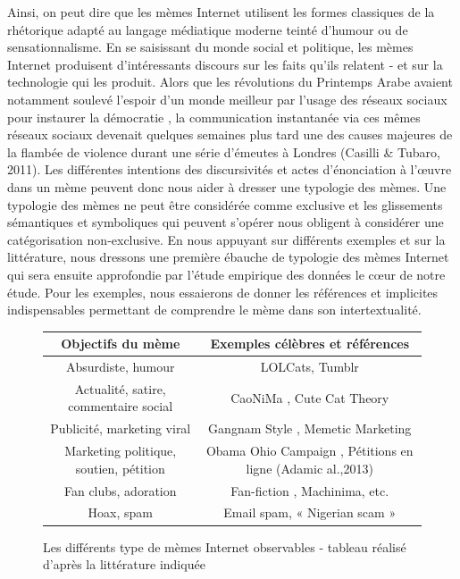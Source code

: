 Ainsi, on peut dire que les m\`emes Internet utilisent les formes
classiques de la rh\'etorique adapt\'e au langage m\'ediatique moderne
teint\'e d{\textquoteright}humour ou de sensationnalisme. En se
saisissant du monde social et politique, les m\`emes Internet
produisent d{\textquoteright}int\'eressants discours sur les faits
qu{\textquoteright}ils relatent - et sur la technologie qui les
produit. Alors que les r\'evolutions du Printemps Arabe avaient
notamment soulev\'e l{\textquoteright}espoir d{\textquoteright}un monde
meilleur par l{\textquoteright}usage des r\'eseaux sociaux pour
instaurer la d\'emocratie \cite{Lotan et al.2011}, la communication
instantan\'ee via ces m\^emes r\'eseaux sociaux devenait quelques
semaines plus tard une des causes majeures de la flamb\'ee de violence
durant une s\'erie d{\textquoteright}\'emeutes \`a Londres (Casilli \&
Tubaro, 2011). Les diff\'erentes intentions des discursivit\'es et
actes d{\textquoteright}\'enonciation \`a l{\textquoteright}{\oe}uvre
dans un m\`eme peuvent donc nous aider \`a dresser une typologie des
m\`emes. Une typologie des m\`emes ne peut \^etre consid\'er\'ee comme
exclusive et les glissements s\'emantiques et symboliques qui peuvent
s{\textquoteright}op\'erer nous obligent \`a consid\'erer une
cat\'egorisation non-exclusive. En nous appuyant sur diff\'erents
exemples et sur la litt\'erature, nous dressons une premi\`ere
\'ebauche de typologie des m\`emes Internet qui sera ensuite
approfondie par l{\textquoteright}\'etude empirique des donn\'ees le
c{\oe}ur de notre \'etude. Pour les exemples, nous essaierons de donner
les r\'ef\'erences et implicites indispensables permettant de
comprendre le m\`eme dans son intertextualit\'e.

\begin{figure}
    \centering
    \begin{tabular}{c|c}
    Objectifs du mème  & Exemples célèbres et références \\
    \hline
    Absurdiste, humour &  LOLCats, Tumblr \cite{Bauckhage2011} \\
    \hline
    Actualité, satire, commentaire social  & CaoNiMa \cite{Mina2012}, Cute Cat Theory \cite{Zuckerman2010} \\
    \hline
    Publicité, marketing viral & Gangnam Style \cite{Bolsover2013}, Memetic Marketing \cite{Flor2000} \\
    \hline
    Marketing politique, soutien, pétition & Obama Ohio Campaign \cite{Walker2012}, Pétitions en ligne (Adamic al.,2013) \\
    \hline
    Fan clubs, adoration  &  Fan-fiction , Machinima, etc. \\
    \hline
    Hoax, spam & Email spam, « Nigerian scam » \\
    \hline
    \end{tabular}

\caption[Typologie des mèmes]{Les diff\'erents type de m\`emes Internet observables - tableau r\'ealis\'e d{\textquoteright}apr\`es la litt\'erature indiqu\'ee}
\label{fig:typologie-memes}

\end{figure}


